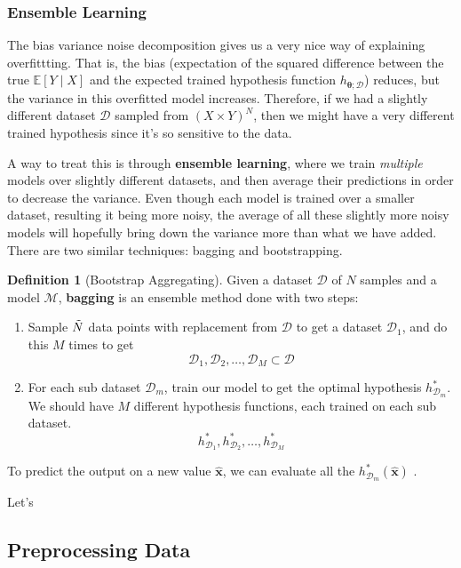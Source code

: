 \documentclass{article}
\theoremstyle{definition}
\theoremstyle{remark}
\theoremstyle{definition}
\newtheorem{definition}{Definition}[section]
\begin{document}
\subsubsection{Ensemble Learning}

The bias variance noise decomposition gives us a very nice way of explaining overfittting. That is, the bias (expectation of the squared difference between the true $\mathbb{E}[Y \mid X]$ and the expected trained hypothesis function $h_{\boldsymbol{\theta}; \mathcal{D}}$) reduces, but the variance in this overfitted model increases. Therefore, if we had a slightly different dataset $\mathcal{D}$ sampled from $(X \times Y)^N$, then we might have a very different trained hypothesis since it's so sensitive to the data. 

A way to treat this is through \textbf{ensemble learning}, where we train \textit{multiple} models over slightly different datasets, and then average their predictions in order to decrease the variance. Even though each model is trained over a smaller dataset, resulting it being more noisy, the average of all these slightly more noisy models will hopefully bring down the variance more than what we have added. There are two similar techniques: bagging and bootstrapping. 

\begin{definition}[Bootstrap Aggregating]
Given a dataset $\mathcal{D}$ of $N$ samples and a model $\mathcal{M}$, \textbf{bagging} is an ensemble method done with two steps: 
\begin{enumerate}
    \item Sample $\Tilde{N}$ data points with replacement from $\mathcal{D}$ to get a dataset $\mathcal{D}_1$, and do this $M$ times to get 
    \[\mathcal{D}_1, \mathcal{D}_2, \ldots, \mathcal{D}_M \subset \mathcal{D}\]
    \item For each sub dataset $\mathcal{D}_m$, train our model to get the optimal hypothesis $h_{\mathcal{D}_m}^\ast$. We should have $M$ different hypothesis functions, each trained on each sub dataset. 
    \[h_{\mathcal{D}_1}^\ast, h_{\mathcal{D}_2}^\ast, \ldots, h_{\mathcal{D}_M}^\ast\]
\end{enumerate}
To predict the output on a new value $\hat{\mathbf{x}}$, we can evaluate all the $h_{\mathcal{D}_m}^\ast (\hat{\mathbf{x}})$ .
\end{definition}

Let's


\subsection{Preprocessing Data}
\end{document}

